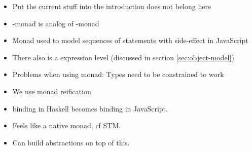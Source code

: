 \begin{itemize}
\item Put the current stuff into the introduction does not belong here
\item \JS-monad is analog of \IO-monad
\item Monad used to model sequences of statements with side-effect in 
JavaScript \cite{Moggi:91:ComputationMonads}
\item There also is a expression level (discussed in section \ref{sec:object-model})
\item Problems when using monad: Types need to be constrained to work
\item We use monad reification \cite{Apfelmus:10:Operational,Hackage:10:Operational}
\item binding in Haskell becomes binding in JavaScript.
\item Feels like a native monad, cf STM.
\item Can build abstractions on top of this.
\end{itemize}




